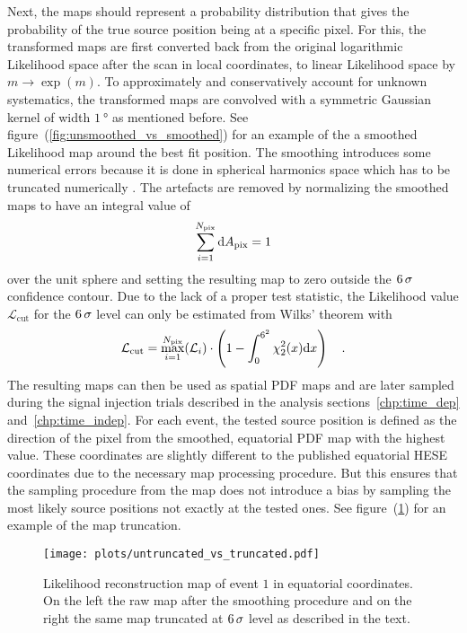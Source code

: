 Next, the maps should represent a probability distribution that gives the probability of the true source position being at a specific pixel.
For this, the transformed maps are first converted back from the original logarithmic Likelihood space after the scan in local coordinates, to linear Likelihood space by $m\rightarrow \exp{(m)}$.
To approximately and conservatively account for unknown systematics, the transformed maps are convolved with a symmetric Gaussian kernel of width $\SI{1}{\degree}$ as mentioned before.
See figure~(\ref{fig:unsmoothed_vs_smoothed}) for an example of the a smoothed Likelihood map around the best fit position.
The smoothing introduces some numerical errors because it is done in spherical harmonics space which has to be truncated numerically \cite{Gorski:2004by}.
The artefacts are removed by normalizing the smoothed maps to have an integral value of
\begin{equation}
  \sum_{i=1}^{N_\text{pix}} \mathrm{d}A_\text{pix} = 1
\end{equation}
over the unit sphere and setting the resulting map to zero outside the $\num{6}\,\sigma$ confidence contour.
Due to the lack of a proper test statistic, the Likelihood value $\mathcal{L}_\text{cut}$ for the $\num{6}\,\sigma$ level can only be estimated from Wilks' theorem with
\begin{equation}
  \mathcal{L}_\text{cut} =
    \max_{i=1}^{N_\text{pix}}(\mathcal{L}_i)\cdot
    \left(1 - \int_0^{6^2}\chi^2_{2}(x)\mathrm{d}x\right)
  \quad\text{.}
\end{equation}
The resulting maps can then be used as spatial PDF maps and are later sampled during the signal injection trials described in the analysis sections~\ref{chp:time_dep} and~\ref{chp:time_indep}.
For each event, the tested source position is defined as the direction of the pixel from the smoothed, equatorial PDF map with the highest value.
These coordinates are slightly different to the published equatorial HESE coordinates due to the necessary map processing procedure.
But this ensures that the sampling procedure from the map does not introduce a bias by sampling the most likely source positions not exactly at the tested ones.
See figure~(\ref{fig:untruncated_vs_truncated}) for an example of the map truncation.

\begin{figure}[htbp]
  \centering
  \texttt{[image: plots/untruncated\_vs\_truncated.pdf]}
  \caption[Likelihood reconstruction map truncation after smoothing]{
    Likelihood reconstruction map of event $1$ in equatorial coordinates.
    On the left the raw map after the smoothing procedure and on the right the same map truncated at $\num{6}\,\sigma$ level as described in the text.
  }
  \label{fig:untruncated_vs_truncated}
\end{figure}

